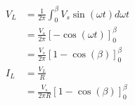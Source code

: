 \subsection{}



\begin{center}
    \xdef\myBeta{225.787377}
       
    \vspace{2cm} \\
       
\end{center}

\begin{align*}
V_L & = \frac{1}{2\pi} \int_0^\beta V_s \sin(\omega t) d \omega t \\
    & = \frac{V_s}{2\pi} \left[ -\cos(\omega t) \right]_0^\beta \\
    & = \frac{V_s}{2\pi} \left[ 1- \cos(\beta) \right]_0^\beta \\
I_L & = \frac{V_L}{R} \\
    & = \frac{V_s}{2\pi{}R} \left[ 1- \cos(\beta) \right]_0^\beta 
\end{align*}

